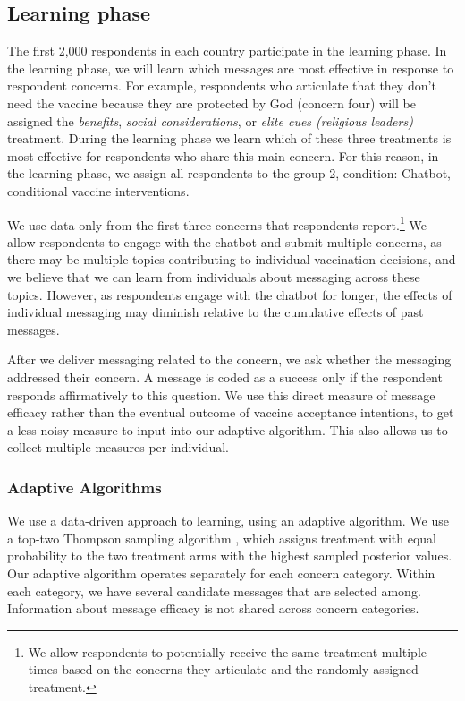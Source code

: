 \documentclass[letterpaper, 12pt, parskip=full,DIV=10]{scrartcl}
\begin{document}
\subsection{Learning phase}

The first 2,000 respondents in each country participate in the learning phase. In the learning phase, we will learn which messages are most effective in response to respondent concerns.  For example, respondents who articulate that they don't need the vaccine because they are protected by God (concern four) will be assigned the \textit{benefits}, \emph{social considerations}, or \emph{elite cues (religious leaders)} treatment. During the learning phase we learn which of these three treatments is most effective for respondents who share this main concern. For this reason, in the learning phase, we assign all respondents to the group 2, condition: Chatbot, conditional vaccine interventions. 

We use data only from the first three concerns that respondents report.\footnote{We allow respondents to potentially receive the same treatment multiple times based on the concerns they articulate and the randomly assigned treatment.} We allow respondents to engage with the chatbot and submit multiple concerns, as there may be multiple topics contributing to individual vaccination decisions, and we believe that we can learn from individuals about messaging across these topics. However, as respondents engage with the chatbot for longer, the effects of individual messaging may diminish relative to the cumulative effects of past messages. 

After we deliver messaging related to the concern, we ask whether the messaging addressed their concern. A message is coded as a success only if the respondent responds affirmatively to this question. We use this direct measure of message efficacy rather than the eventual outcome of vaccine acceptance intentions, to get a less noisy measure to input into our adaptive algorithm. This also allows us to collect multiple measures per individual. 

\subsubsection{Adaptive Algorithms}
We use a data-driven approach to learning, using an adaptive algorithm. We use a top-two Thompson sampling algorithm \citep{russo16a}, which assigns treatment with equal probability to the two treatment arms with the highest sampled posterior values. Our adaptive algorithm operates separately for each concern category. Within each category, we have several candidate messages that are selected among. Information about message efficacy is not shared across concern categories.  
\end{document}
